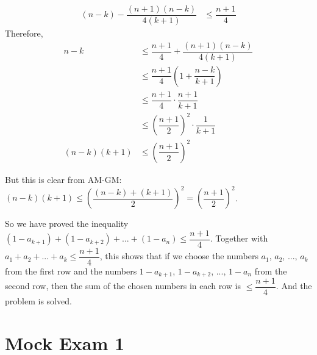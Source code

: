 \documentclass{subfile}
\begin{document}
\begin{solution}
		\begin{align*}
			\left(n-k\right)-\dfrac{\left(n+1\right)\left(n-k\right)}{4\left(k+1\right)} 
				 & \leq\dfrac{n+1}{4}
		\end{align*}
		Therefore,
		\begin{align*}
			 n-k & \leq\dfrac{n+1}{4}+\dfrac{\left(n+1\right)\left(n-k\right)}{4\left(k+1\right)}\\
				 &\leq\dfrac{n+1}{4}\left(1+\dfrac{n-k}{k+1}\right)\\
				 & \leq\dfrac{n+1}{4}\cdot\dfrac{n+1}{k+1}\\
				 & \leq\left(\dfrac{n+1}{2}\right)^2\cdot\dfrac{1}{k+1}\\
			\left(n-k\right)\left(k+1\right)&\leq\left(\dfrac{n+1}{2}\right)^2
		\end{align*}
		
		But this is clear from AM-GM: $\left(n-k\right)\left(k+1\right)\leq\left(\dfrac{\left(n-k\right)+\left(k+1\right)}{2}\right)^2 = \left(\dfrac{n+1}{2}\right)^2$.
		
		So we have proved the inequality $\left(1-a_{k+1}\right)+\left(1-a_{k+2}\right)+...+\left(1-a_n\right)\leq\dfrac{n+1}{4}$. Together with $a_1+a_2+...+a_k\leq\dfrac{n+1}{4}$, this shows that if we choose the numbers $a_1$, $a_2$, ..., $a_k$ from the first row and the numbers $1-a_{k+1}$, $1-a_{k+2}$, ..., $1-a_n$ from the second row, then the sum of the chosen numbers in each row is $\leq\dfrac{n+1}{4}$. And the problem is solved.
		
	\end{solution}
	
	\newpage
	
	\section{Mock Exam 1}
	
\end{document}

